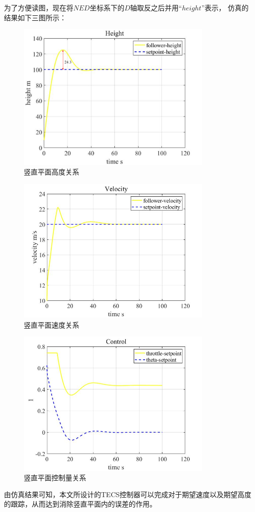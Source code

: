 为了方便读图，现在将$NED$坐标系下的$D$轴取反之后并用“$height$”表示，
仿真的结果如下三图所示：
\begin{figure}[H]
    \centering
    \includegraphics[width=0.85\textwidth]{figures/c5/c5-TECS-height.jpg}
    \caption{竖直平面高度关系}\label{fig:c5-TECS-height}
\end{figure}
\begin{figure}[H]
    \centering
    \includegraphics[width=0.85\textwidth]{figures/c5/c5-TECS-vel.jpg}
    \caption{竖直平面速度关系}\label{fig:c5-TECS-vel}
\end{figure}
\begin{figure}[H]
    \centering
    \includegraphics[width=0.85\textwidth]{figures/c5/c5-TECS-control.jpg}
    \caption{竖直平面控制量关系}\label{fig:c5-TECS-control}
\end{figure}
由仿真结果可知，本文所设计的TECS控制器可以完成对于期望速度以及期望高度的跟踪，从而达到消除竖直平面内的误差的作用。
